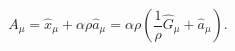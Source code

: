 \begin{equation}
A_{\mu}=\hat{x}_{\mu}+ \alpha \rho \hat{a}_{\mu} 
=\alpha\rho \left( \frac{1}{\rho}\hat{G}_{\mu}+ \hat{a}_{\mu} \right). 
\label{expansionmatrices}
\end{equation}

